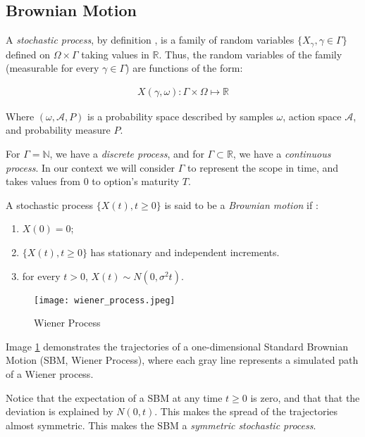 \subsection{Brownian Motion}

A \textit{stochastic process}, by definition \cite{Iacus2008}, is a family of random variables $\{X_\gamma,\gamma\in\Gamma\}$ defined on $\Omega\times\Gamma$ taking values in $\mathbb{R}$. Thus, the random variables of the family (measurable for every $\gamma\in\Gamma$) are functions of the form:

\begin{align*}
X(\gamma,\omega):\Gamma\times\Omega\mapsto\mathbb{R}
\end{align*}

Where $(\omega,\mathcal{A},P)$ is a probability space described by samples $\omega$, action space $\mathcal{A}$, and probability measure $P$.

For $\Gamma=\mathbb{N}$, we have a \textit{discrete process}, and for $\Gamma\subset\mathbb{R}$, we have a \textit{continuous process}. In our context we will consider $\Gamma$ to represent the scope in time, and takes values from $0$ to option's maturity $T$.

A stochastic process $\{X(t), t\geq 0\}$ is said to be a \textit{Brownian motion} if \cite{Iacus2008}:

\begin{enumerate}
	\item $X(0)=0$;
	\item $\{X(t),t\geq0\}$ has stationary and independent increments.
	\item for every $t>0$, $X(t)\sim N(0,\sigma^2 t)$.
\end{enumerate}

\begin{figure}[H] \label{img:wiener_process}
	\centering
	\texttt{[image: wiener\_process.jpeg]}
	\caption{Wiener Process}
\end{figure}

Image \ref{img:wiener_process} demonstrates the trajectories of a one-dimensional Standard Brownian Motion (SBM, Wiener Process), where each gray line represents a simulated path of a Wiener process.

Notice that the expectation of a SBM at any time $t\geq0$ is zero, and that that the deviation is explained by $N(0,t)$. This makes the spread of the trajectories almost symmetric. This makes the SBM a \textit{symmetric stochastic process}.



